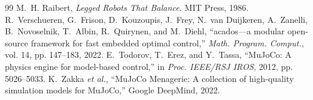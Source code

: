 \documentclass[11pt]{article}
\begin{document}
\begin{thebibliography}{99}
 M.~H. Raibert, \emph{Legged Robots That Balance}. MIT Press, 1986.
 R.~Verschueren, G.~Frison, D.~Kouzoupis, J.~Frey, N.~van Duijkeren, A.~Zanelli, B.~Novoselnik, T.~Albin, R.~Quirynen, and M.~Diehl, ``acados---a modular open-source framework for fast embedded optimal control,'' \emph{Math. Program. Comput.}, vol. 14, pp. 147--183, 2022.
 E.~Todorov, T.~Erez, and Y.~Tassa, ``MuJoCo: A physics engine for model-based control,'' in \emph{Proc. IEEE/RSJ IROS}, 2012, pp. 5026--5033.
 K.~Zakka \emph{et al.}, ``MuJoCo Menagerie: A collection of high-quality simulation models for MuJoCo,'' Google DeepMind, 2022.
\end{thebibliography}
\end{document}
